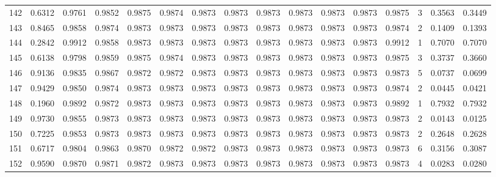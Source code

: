 \begin{tabular}{lrrrrrrrrrrrrrrr}
142 &      0.6312 &  0.9761 &  0.9852 &  0.9875 &  0.9874 &  0.9873 &  0.9873 &  0.9873 &  0.9873 &  0.9873 &   0.9873 &     0.9875 &      3 &                    0.3563 &                     0.3449 \\
143 &      0.8465 &  0.9858 &  0.9874 &  0.9873 &  0.9873 &  0.9873 &  0.9873 &  0.9873 &  0.9873 &  0.9873 &   0.9873 &     0.9874 &      2 &                    0.1409 &                     0.1393 \\
144 &      0.2842 &  0.9912 &  0.9858 &  0.9873 &  0.9873 &  0.9873 &  0.9873 &  0.9873 &  0.9873 &  0.9873 &   0.9873 &     0.9912 &      1 &                    0.7070 &                     0.7070 \\
145 &      0.6138 &  0.9798 &  0.9859 &  0.9875 &  0.9874 &  0.9873 &  0.9873 &  0.9873 &  0.9873 &  0.9873 &   0.9873 &     0.9875 &      3 &                    0.3737 &                     0.3660 \\
146 &      0.9136 &  0.9835 &  0.9867 &  0.9872 &  0.9872 &  0.9873 &  0.9873 &  0.9873 &  0.9873 &  0.9873 &   0.9873 &     0.9873 &      5 &                    0.0737 &                     0.0699 \\
147 &      0.9429 &  0.9850 &  0.9874 &  0.9873 &  0.9873 &  0.9873 &  0.9873 &  0.9873 &  0.9873 &  0.9873 &   0.9873 &     0.9874 &      2 &                    0.0445 &                     0.0421 \\
148 &      0.1960 &  0.9892 &  0.9872 &  0.9873 &  0.9873 &  0.9873 &  0.9873 &  0.9873 &  0.9873 &  0.9873 &   0.9873 &     0.9892 &      1 &                    0.7932 &                     0.7932 \\
149 &      0.9730 &  0.9855 &  0.9873 &  0.9873 &  0.9873 &  0.9873 &  0.9873 &  0.9873 &  0.9873 &  0.9873 &   0.9873 &     0.9873 &      2 &                    0.0143 &                     0.0125 \\
150 &      0.7225 &  0.9853 &  0.9873 &  0.9873 &  0.9873 &  0.9873 &  0.9873 &  0.9873 &  0.9873 &  0.9873 &   0.9873 &     0.9873 &      2 &                    0.2648 &                     0.2628 \\
151 &      0.6717 &  0.9804 &  0.9863 &  0.9870 &  0.9872 &  0.9872 &  0.9873 &  0.9873 &  0.9873 &  0.9873 &   0.9873 &     0.9873 &      6 &                    0.3156 &                     0.3087 \\
152 &      0.9590 &  0.9870 &  0.9871 &  0.9872 &  0.9873 &  0.9873 &  0.9873 &  0.9873 &  0.9873 &  0.9873 &   0.9873 &     0.9873 &      4 &                    0.0283 &                     0.0280 \\

\end{tabular}
